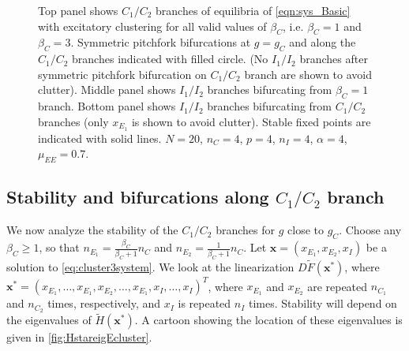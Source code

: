 \documentclass[reqno]{siamonline190516}
\newcommand{\xvec}{\mathbf{x}}
\begin{document}
\begin{figure}
    \caption{Top panel shows $C_1/C_2$ branches of equilibria of \cref{eqn:sys_Basic} with excitatory clustering for all valid values of $\beta_C$, i.e. $\beta_C =1$ and $\beta_C=3$. Symmetric pitchfork bifurcations at $g = g_C$ and along the $C_1/C_2$ branches indicated with filled circle. (No $I_1/I_2$ branches after symmetric pitchfork bifurcation on $C_1/C_2$ branch are shown to avoid clutter). Middle panel shows $I_1/I_2$ branches bifurcating from $\beta_C = 1$ branch. Bottom panel shows $I_1/I_2$ branches bifurcating from $C_1/C_2$ branches (only $x_{E_1}$ is shown to avoid clutter). Stable fixed points are indicated with solid lines. $N = 20$, $n_C = 4$, $p = 4$, $n_I = 4$, $\alpha = 4$, $\mu_{EE} = 0.7$.}
    \label{fig:clusterBD1}
\end{figure}

\subsection{Stability and bifurcations along \texorpdfstring{$C_1/C_2$}{C1/C2} branch}\label{sec:C1C2stability}

We now analyze the stability of the $C_1/C_2$ branches for $g$ close to $g_C$. Choose any $\beta_C \geq 1$, so that $n_{E_1} = \frac{\beta_C}{\beta_C+1}n_C$ and $n_{E_2} = \frac{1}{\beta_C+1}n_C$. Let $\xvec = (x_{E_1}, x_{E_2}, x_{I})$ be a solution to \cref{eq:cluster3system}. We look at the linearization $D\tilde{F}(\xvec^*)$, where $\xvec^* = (x_{E_1}, \dots, x_{E_1}, x_{E_2}, \dots, x_{E_1}, x_{I}, \dots, x_{I})^T$, where $x_{E_1}$ and $x_{E_2}$ are repeated $n_{C_1}$ and $n_{C_2}$ times, respectively, and $x_I$ is repeated $n_I$ times. Stability will depend on the eigenvalues of $\tilde{H}(\xvec^*)$. A cartoon showing the location of these eigenvalues is given in \cref{fig:HstareigEcluster}. 
\end{document}
